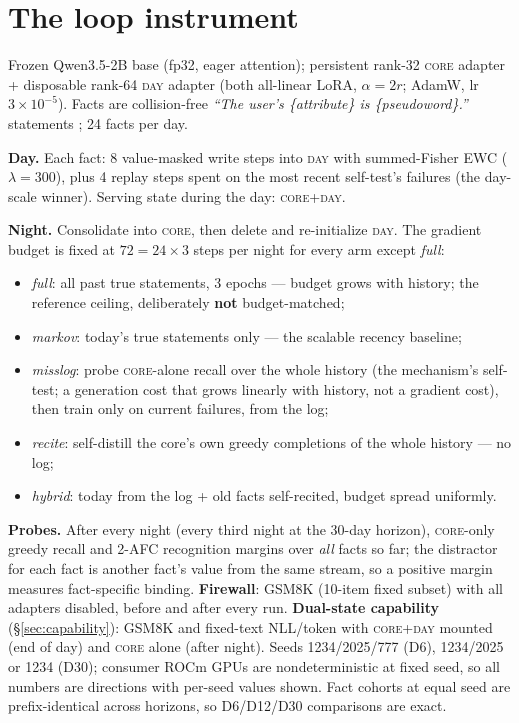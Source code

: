 \documentclass[11pt]{article}
\newcommand{\qwen}{Qwen3.5-2B}
\begin{document}
\section{The loop instrument}\label{sec:instrument}

Frozen \qwen{} base (fp32, eager attention); persistent rank-32 \textsc{core} adapter + disposable
rank-64 \textsc{day} adapter (both all-linear LoRA, $\alpha{=}2r$; AdamW, lr $3{\times}10^{-5}$).
Facts are collision-free \emph{``The user's \{attribute\} is \{pseudoword\}.''} statements
\citep[the day-scale instrument of][]{lin2026persistence}; 24 facts per day.

\textbf{Day.} Each fact: 8 value-masked write steps into \textsc{day} with summed-Fisher EWC
($\lambda{=}300$), plus 4 replay steps spent on the most recent self-test's failures (the day-scale
winner). Serving state during the day: \textsc{core+day}.

\textbf{Night.} Consolidate into \textsc{core}, then delete and re-initialize \textsc{day}. The
gradient budget is fixed at $72 = 24\times3$ steps per night for every arm except \emph{full}:
\begin{itemize}
\item \emph{full}: all past true statements, 3 epochs --- budget grows with history; the reference
ceiling, deliberately \textbf{not} budget-matched;
\item \emph{markov}: today's true statements only --- the scalable recency baseline;
\item \emph{misslog}: probe \textsc{core}-alone recall over the whole history (the mechanism's
self-test; a generation cost that grows linearly with history, not a gradient cost), then train only
on current failures, from the log;
\item \emph{recite}: self-distill the core's own greedy completions of the whole history --- no log;
\item \emph{hybrid}: today from the log + old facts self-recited, budget spread uniformly.
\end{itemize}

\textbf{Probes.} After every night (every third night at the 30-day horizon), \textsc{core}-only
greedy recall and 2-AFC recognition margins over \emph{all} facts so far; the distractor for each
fact is another fact's value from the same stream, so a positive margin measures fact-specific
binding. \textbf{Firewall}: GSM8K (10-item fixed subset) with all adapters disabled, before and
after every run. \textbf{Dual-state capability} (\S\ref{sec:capability}): GSM8K and fixed-text
NLL/token with \textsc{core+day} mounted (end of day) and \textsc{core} alone (after night).
Seeds 1234/2025/777 (D6), 1234/2025 or 1234 (D30); consumer ROCm GPUs are nondeterministic at fixed
seed, so all numbers are directions with per-seed values shown. Fact cohorts at equal seed are
prefix-identical across horizons, so D6/D12/D30 comparisons are exact.
\end{document}
